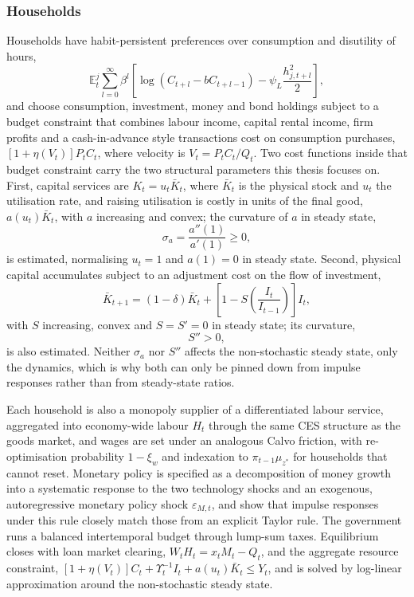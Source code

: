\documentclass[12pt, a4paper]{article}
\begin{document}
\begin{appendices}
\subsubsection*{Households}

Households have habit-persistent preferences over consumption and disutility of hours,
\begin{equation}
    \mathbb{E}_t^j \sum_{l=0}^{\infty} \beta^l \left[ \log(C_{t+l} - b C_{t+l-1}) - \psi_L \frac{h_{j,t+l}^2}{2} \right],
    \label{eq:app_utility}
\end{equation}
and choose consumption, investment, money and bond holdings subject to a budget constraint that
combines labour income, capital rental income, firm profits and a cash-in-advance style
transactions cost on consumption purchases, $[1+\eta(V_t)]P_tC_t$, where velocity is
$V_t = P_tC_t/Q_t$. Two cost functions inside that budget constraint carry the two structural
parameters this thesis focuses on. First, capital services are $K_t = u_t\bar{K}_t$, where
$\bar{K}_t$ is the physical stock and $u_t$ the utilisation rate, and raising utilisation is
costly in units of the final good, $a(u_t)\bar{K}_t$, with $a$ increasing and convex; the
curvature of $a$ in steady state,
\begin{equation}
    \sigma_a = \frac{a''(1)}{a'(1)} \ge 0,
    \label{eq:app_sigmaa}
\end{equation}
is estimated, normalising $u_t=1$ and $a(1)=0$ in steady state. Second, physical capital
accumulates subject to an adjustment cost on the flow of investment,
\begin{equation}
    \bar{K}_{t+1} = (1-\delta)\bar{K}_t + \left[1 - S\!\left(\frac{I_t}{I_{t-1}}\right)\right] I_t,
    \label{eq:app_capaccum}
\end{equation}
with $S$ increasing, convex and $S=S'=0$ in steady state; its curvature,
\begin{equation}
    S'' > 0,
    \label{eq:app_Spp}
\end{equation}
is also estimated. Neither $\sigma_a$ nor $S''$ affects the non-stochastic steady state, only
the dynamics, which is why both can only be pinned down from impulse responses rather than from
steady-state ratios.

Each household is also a monopoly supplier of a differentiated labour service, aggregated into
economy-wide labour $H_t$ through the same CES structure as the goods market, and wages are set
under an analogous Calvo friction, with re-optimisation probability $1-\xi_w$ and indexation to
$\pi_{t-1}\mu_{z^{*}}$ for households that cannot reset. Monetary policy is specified as a
decomposition of money growth into a systematic response to the two technology shocks and an
exogenous, autoregressive monetary policy shock $\varepsilon_{M,t}$, and \citet{CEE2005} show
that impulse responses under this rule closely match those from an explicit Taylor rule. The
government runs a balanced intertemporal budget through lump-sum taxes. Equilibrium closes with
loan market clearing, $W_tH_t = x_tM_t - Q_t$, and the aggregate resource constraint,
$[1+\eta(V_t)]C_t + \Upsilon_t^{-1}I_t + a(u_t)\bar{K}_t \le Y_t$, and is solved by log-linear
approximation around the non-stochastic steady state.


\end{appendices}
\end{document}
